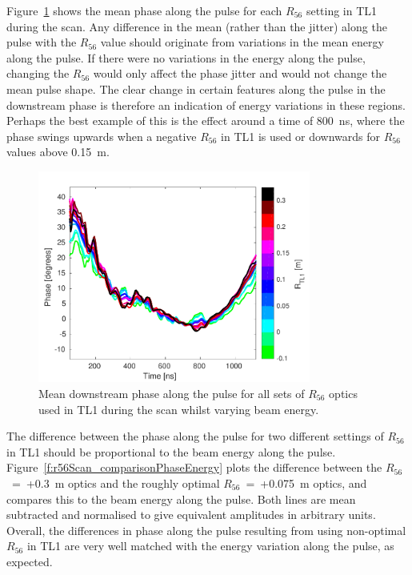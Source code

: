 Figure~\ref{f:r56Scan_meanPhaseAlong} shows the mean phase along the pulse for each \(R_{56}\) setting in TL1 during the scan. Any difference in the mean (rather than the jitter) along the pulse with the \(R_{56}\) value should originate from variations in the mean energy along the pulse. If there were no variations in the energy along the pulse, changing the \(R_{56}\) would only affect the phase jitter and would not change the mean pulse shape. The clear change in certain features along the pulse in the downstream phase is therefore an indication of energy variations in these regions. Perhaps the best example of this is the effect around a time of 800~ns, where the phase swings upwards when a negative \(R_{56}\) in TL1 is used or downwards for \(R_{56}\) values above 0.15~m.

\begin{figure}
  \centering
  \includegraphics[width=0.8\textwidth]{Figures/propagation/r56Scan_meanPhaseAlong}
  \caption{Mean downstream phase along the pulse for all sets of \(R_{56}\) optics used in TL1 during the scan whilst varying beam energy.}
  \label{f:r56Scan_meanPhaseAlong}
\end{figure}

The difference between the phase along the pulse for two different settings of \(R_{56}\) in TL1 should be proportional to the beam energy along the pulse. Figure~\ref{f:r56Scan_comparisonPhaseEnergy} plots the difference between the \(R_{56}\)~=~+0.3~m optics and the roughly optimal \(R_{56}\)~=~+0.075~m optics, and compares this to the beam energy along the pulse. Both lines are mean subtracted and normalised to give equivalent amplitudes in arbitrary units. Overall, the differences in phase along the pulse resulting from using non-optimal \(R_{56}\) in TL1 are very well matched with the energy variation along the pulse, as expected. 

